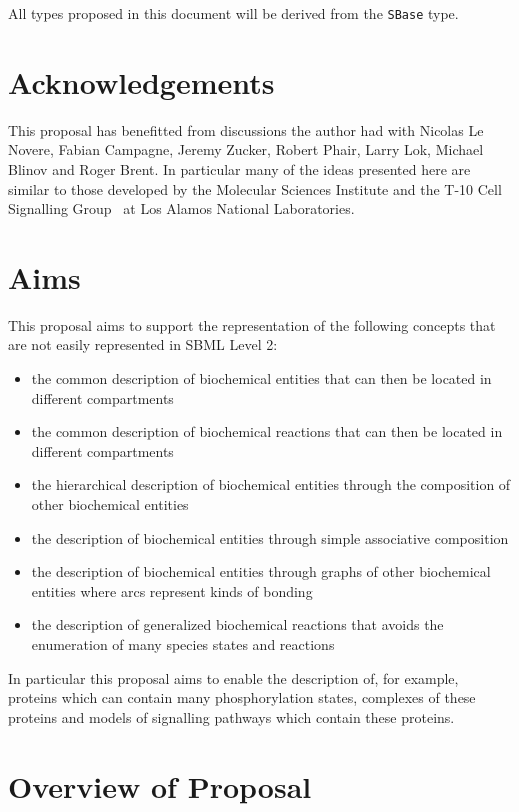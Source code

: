\documentclass{cekarticle}
\begin{document}
All types proposed in this document will be derived from the
\texttt{SBase} type.


\section{Acknowledgements}

This proposal has benefitted from discussions the author had with Nicolas Le Novere,
Fabian Campagne, Jeremy Zucker, Robert Phair, Larry Lok, Michael Blinov and Roger Brent.
In particular many of the ideas presented here are similar to those developed by the Molecular
Sciences Institute and the T-10 Cell Signalling Group~\citep{goldstein:2001} at Los
Alamos National Laboratories.

\section{Aims}

This proposal aims to support the representation of the following concepts that are not easily
represented in SBML Level 2:

\begin{itemize}
\item the common description of biochemical entities that can then be located in different
compartments
\item the common description of biochemical reactions that can then be located in different
compartments
\item the hierarchical description of biochemical entities through the composition of other
biochemical entities
\item the description of biochemical entities through simple associative composition
\item the description of biochemical entities through graphs of other biochemical entities
where arcs represent kinds of bonding
\item the description of generalized biochemical reactions that avoids the enumeration of
many species states and reactions
\end{itemize}

In particular this proposal aims to enable the description of, for example, proteins which
can contain many phosphorylation states,
complexes of these proteins and models of signalling pathways which contain these proteins.

\clearpage

\section{Overview of Proposal}
\end{document}
